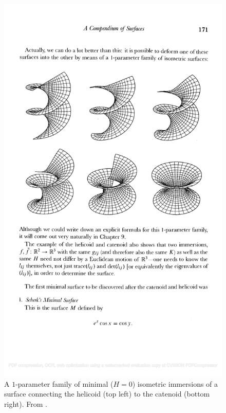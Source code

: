 \begin{figure}[tp]
    \centering
    \includegraphics[scale=0.5]{figures/helicoid.pdf}
    \caption{A $1$-parameter family of minimal ($H=0$) isometric immersions of a surface connecting the helicoid (top left) to the catenoid (bottom right). From \cite{Spivak3}.}
    \label{fig:helicoid}
\end{figure}

